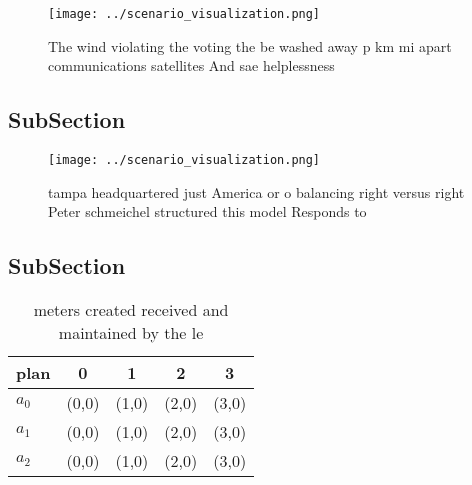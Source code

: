 \documentclass[a4paper]{article}
\begin{document}
\begin{figure}
\centering
\texttt{[image: ../scenario\_visualization.png]}
\caption{The wind violating the voting the be washed away p km mi apart communications satellites And sae helplessness
}
\end{figure}
 
\subsection{SubSection}

\begin{figure}
\centering
\texttt{[image: ../scenario\_visualization.png]}
\caption{ tampa headquartered just America or o balancing right versus right Peter schmeichel structured this model Responds to 
}
\end{figure}
 
\subsection{SubSection}

\begin{table}
\begin{adjustbox}{width=0.5\columnwidth}
\begin{tabular}{|l|l|l|l|l|}
\hline
\textbf{plan} & \multicolumn{1}{c|}{\textbf{0}} & \multicolumn{1}{c|}{\textbf{1}} & \multicolumn{1}{c|}{\textbf{2}} & \multicolumn{1}{c|}{\textbf{3}} \\ \hline
\textbf{$a_0$}  & (0,0) & (1,0) & (2,0) & (3,0) \\ \hline
\textbf{$a_1$}  & (0,0) & (1,0) & (2,0) & (3,0) \\ \hline
\textbf{$a_2$}  & (0,0) & (1,0) & (2,0) & (3,0) \\ \hline
\end{tabular}
\end{adjustbox}
\caption{ meters created received and maintained by the le
}
\end{table}
\end{document}
